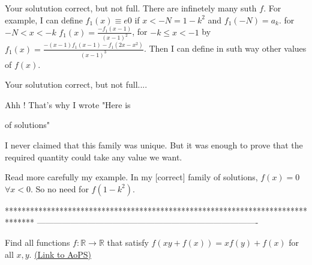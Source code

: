 \begin{solution}
	Your solutution correct, but not full.
There are infinetely many suth $f$.
For example, I can define $f_1(x)\equiv e 0$ if $x<-N=1-k^2$ and $f_1(-N)=a_k$.
for $-N<x<-k$ $f_1(x)=\frac{-f_1(x-1)}{(x-1)^2}$, for $-k\le x<-1$ by $f_1(x)=\frac{-(x-1)f_1(x-1)-f_1(2x-x^2)}{(x-1)^3}$.
Then I can define in suth way other values of $f(x)$.
\end{solution}



\begin{solution}
	\begin{tcolorbox}Your solutution correct, but not full....\end{tcolorbox}
Ahh ! That's why I wrote "Here isof solutions"

I never claimed that this family was unique. But it was enough to prove that the required quantity could take any value we want.
\end{solution}






\begin{solution}
	Read more carefully my example. In my [correct] family of solutions, $f(x)=0$ $\forall x<0$. So no need for $f(1-k^2)$.
\end{solution}
*******************************************************************************
-------------------------------------------------------------------------------

\begin{problem}
	Find all functions $f: \mathbb{R}\to\mathbb{R}$ that satisfy $f(xy+f(x))=xf(y)+f(x)$ for all $x,y$.
	\flushright \href{https://artofproblemsolving.com/community/c6h574572}{(Link to AoPS)}
\end{problem}



